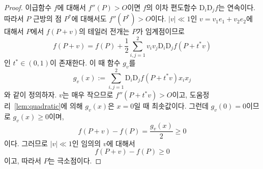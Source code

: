 \documentclass[unfonts,oneside,a4paper]{oblivoir}
\theoremstyle{definition}
\theoremstyle{theorem}
\renewcommand{\vec}[1]{\bm{\mathit{#1}}}
\newcommand{\vecz}{\bm{\mathrm{0}}}
\newcommand{\dD}{\mathrm{D}}
\begin{document}
\begin{proof}
    이급함수 $f$에 대해서 $f''(P) > O$이면 $f$의 이차 편도함수 $\dD_i \dD_j f$는 연속이다.
    따라서 $P$ 근방의 점 $P^*$에 대해서도 $f''(P^*) > O$이다.
    $|\vec v| \ll 1$인 $\vec v = v_1 \vec e_1 + v_2 \vec e_2$에 대해서 $P$에서 $f(P +
    \vec v)$의 테일러 전개는 $P$가 임계점이므로
    \begin{equation*}
         f(P + \vec v) = f(P) + \frac 12 \sum_{i, j = 1}^2 v_i v_j \dD_i \dD_j f(P + t^* \vec v)
    \end{equation*}
    인 $t^* \in (0, 1)$이 존재한다.
    이 때 함수 $g_{\vec v}$를
    \begin{equation*}
        g_{\vec v}(\vec x) := \sum_{i, j = 1}^2 \dD_i \dD_j f(P + t^*\vec v) x_i x_j
    \end{equation*}
    와 같이 정의하자.
    $\vec v$는 매우 작으므로 $f''(P + t^* \vec v) > O$이고, 도움정리~\ref{lem:quadratic}에 의해 $g_{\vec v}(\vec x)$은 $\vec x = \vecz$일 때 최솟값이다.
    그런데 $g_{\vec v}(\vecz) = 0$이므로 $g_{\vec v}(\vec x) \geq 0$이며,
    \begin{equation*}
        f(P + \vec v) - f(P) = \frac{g_{\vec v}(\vec x)}{2} \geq 0
    \end{equation*}
    이다.
    그러므로 $|\vec v| \ll 1$인 임의의 $\vec v$에 대해서
    \begin{equation*}
        f(P + \vec v) - f(P) \geq 0
     \end{equation*}
     이고, 따라서 $P$는 극소점이다.
\end{proof}
\end{document}
